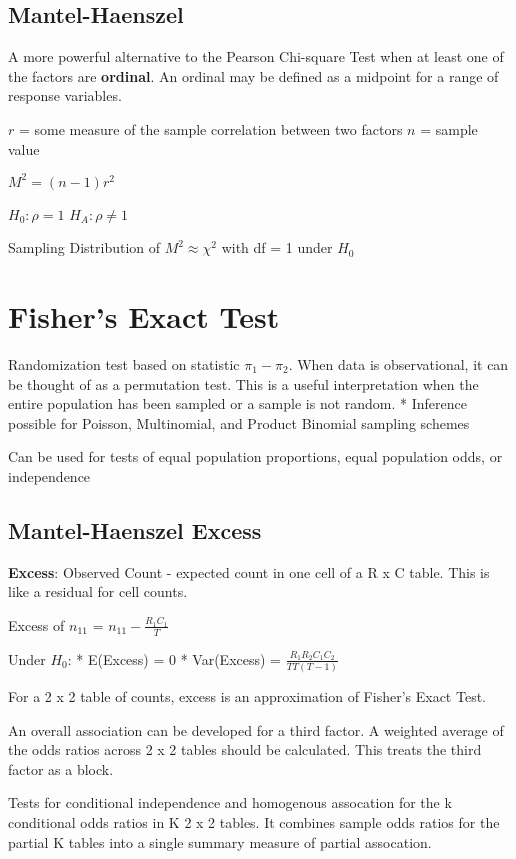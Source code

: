 \documentclass[11pt]{article}
\begin{document}
\subsection{Mantel-Haenszel}
\label{sec:orgbad9165}
A more powerful alternative to the Pearson Chi-square Test when at least
one of the factors are \textbf{ordinal}. An ordinal may be defined as a
midpoint for a range of response variables.

\(r\) = some measure of the sample correlation between two factors \(n\) =
sample value

\(M^2 = (n - 1)r^2\)

\(H_0: \rho = 1\) \(H_A: \rho \neq 1\)

Sampling Distribution of \(M^2 \approx \chi^2\) with df = 1 under \(H_0\)

\section{Fisher's Exact Test}
\label{sec:org90ec677}
Randomization test based on statistic \(\pi_1 - \pi_2\). When data is
observational, it can be thought of as a permutation test. This is a
useful interpretation when the entire population has been sampled or a
sample is not random. * Inference possible for Poisson, Multinomial, and
Product Binomial sampling schemes

Can be used for tests of equal population proportions, equal population
odds, or independence

\subsection{Mantel-Haenszel Excess}
\label{sec:orge36c5e6}
\textbf{Excess}: Observed Count - expected count in one cell of a R x C table.
This is like a residual for cell counts.

Excess of \(n_{11}\) = \(n_{11} - \frac{R_1 C_1}{T}\)

Under \(H_0\): * E(Excess) = 0 * Var(Excess) =
\(\frac{R_1 R_2 C_1 C_2}{TT(T - 1)}\)

For a 2 x 2 table of counts, excess is an approximation of Fisher's
Exact Test.

An overall association can be developed for a third factor. A weighted
average of the odds ratios across 2 x 2 tables should be calculated.
This treats the third factor as a block.

Tests for conditional independence and homogenous assocation for the k
conditional odds ratios in K 2 x 2 tables. It combines sample odds
ratios for the partial K tables into a single summary measure of partial
assocation.
\end{document}
